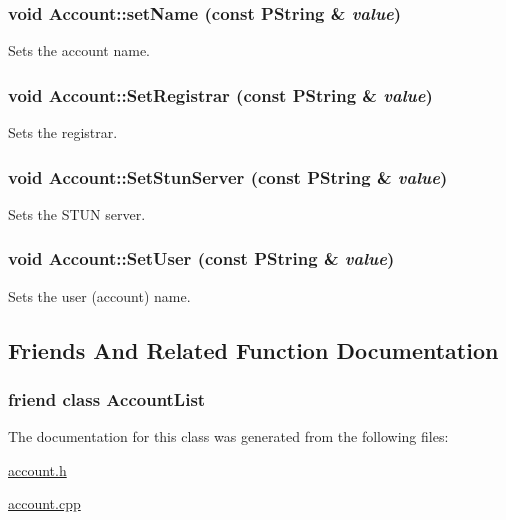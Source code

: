 \hypertarget{classAccount_b4f94471843ffe5c49ef919b7a4c5dfe}{
\subsubsection[{setName}]{\setlength{\rightskip}{0pt plus 5cm}void Account::setName (const PString \& {\em value})}}
\label{classAccount_b4f94471843ffe5c49ef919b7a4c5dfe}


Sets the account name. 

\hypertarget{classAccount_94f9db7a225897c903475c42425b28b1}{
\subsubsection[{SetRegistrar}]{\setlength{\rightskip}{0pt plus 5cm}void Account::SetRegistrar (const PString \& {\em value})}}
\label{classAccount_94f9db7a225897c903475c42425b28b1}


Sets the registrar. 

\hypertarget{classAccount_28e1cfe654d233bb5eea03ae64e030dd}{
\subsubsection[{SetStunServer}]{\setlength{\rightskip}{0pt plus 5cm}void Account::SetStunServer (const PString \& {\em value})}}
\label{classAccount_28e1cfe654d233bb5eea03ae64e030dd}


Sets the STUN server. 

\hypertarget{classAccount_796dd94d9e20801be1fe352fae44095f}{
\subsubsection[{SetUser}]{\setlength{\rightskip}{0pt plus 5cm}void Account::SetUser (const PString \& {\em value})}}
\label{classAccount_796dd94d9e20801be1fe352fae44095f}


Sets the user (account) name. 



\subsection{Friends And Related Function Documentation}
\hypertarget{classAccount_37d0b1f5892301dabdceb70a7ec55ca3}{
\subsubsection[{AccountList}]{\setlength{\rightskip}{0pt plus 5cm}friend class {\bf AccountList}}}
\label{classAccount_37d0b1f5892301dabdceb70a7ec55ca3}




The documentation for this class was generated from the following files:\begin{CompactItemize}
\item 
\hyperlink{account_8h}{account.h}\item 
\hyperlink{account_8cpp}{account.cpp}\end{CompactItemize}
